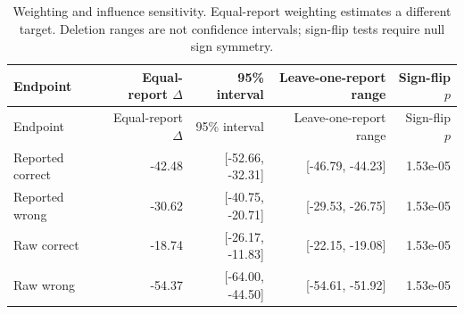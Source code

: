 \begin{longtable}{lrrrr}
\caption{Weighting and influence sensitivity. Equal-report weighting estimates a different target. Deletion ranges are not confidence intervals; sign-flip tests require null sign symmetry.}\\
Endpoint & Equal-report $\Delta$ & 95\% interval & Leave-one-report range & Sign-flip $p$\\\toprule\endfirsthead
Endpoint & Equal-report $\Delta$ & 95\% interval & Leave-one-report range & Sign-flip $p$\\\toprule\endhead
Reported correct & -42.48 & [-52.66, -32.31] & [-46.79, -44.23] & 1.53e-05\\
Reported wrong & -30.62 & [-40.75, -20.71] & [-29.53, -26.75] & 1.53e-05\\
Raw correct & -18.74 & [-26.17, -11.83] & [-22.15, -19.08] & 1.53e-05\\
Raw wrong & -54.37 & [-64.00, -44.50] & [-54.61, -51.92] & 1.53e-05\\
\bottomrule\end{longtable}